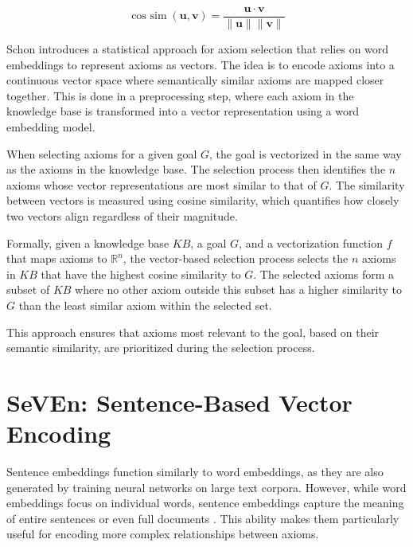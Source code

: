 \documentclass[english,version-2020-11]{uzl-thesis}
\begin{document}
\begin{equation}
    \operatorname{cos\ sim}(\mathbf{u}, \mathbf{v}) = \frac{\mathbf{u} \cdot \mathbf{v}}{\|\mathbf{u}\| \|\mathbf{v}\|}
\end{equation}

Schon \cite{Schon2023} introduces a statistical approach for axiom selection that relies on word embeddings to represent axioms as vectors. The idea is to encode axioms into a continuous vector space where semantically similar axioms are mapped closer together. This is done in a preprocessing step, where each axiom in the knowledge base is transformed into a vector representation using a word embedding model.

When selecting axioms for a given goal \( G \), the goal is vectorized in the same way as the axioms in the knowledge base. The selection process then identifies the \( n \) axioms whose vector representations are most similar to that of \( G \). The similarity between vectors is measured using cosine similarity, which quantifies how closely two vectors align regardless of their magnitude.

Formally, given a knowledge base \( KB \), a goal \( G \), and a vectorization function \( f \) that maps axioms to \( \mathbb{R}^n \), the vector-based selection process selects the \( n \) axioms in \( KB \) that have the highest cosine similarity to \( G \). The selected axioms form a subset of \( KB \) where no other axiom outside this subset has a higher similarity to \( G \) than the least similar axiom within the selected set.

This approach ensures that axioms most relevant to the goal, based on their semantic similarity, are prioritized during the selection process.

\section{SeVEn: Sentence-Based Vector Encoding}

Sentence embeddings function similarly to word embeddings, as they are also generated by training neural networks on large text corpora. However, while word embeddings focus on individual words, sentence embeddings capture the meaning of entire sentences or even full documents \cite{Kiros2015SkipThought}. This ability makes them particularly useful for encoding more complex relationships between axioms.
\end{document}

